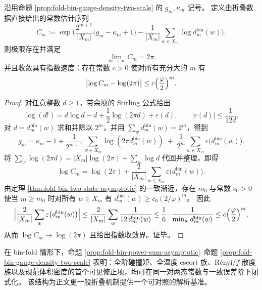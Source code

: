 \begin{corollary}\label{cor:fold-bin-recover-2pi}
沿用命题 \ref{prop:fold-bin-gauge-density-two-scale} 的 \(g_m,\kappa_m\) 记号。
定义由折叠数据直接给出的常数估计序列
\[
C_m
:=\exp\!\Biggl(
\frac{2^{m+1}}{|X_m|}\bigl(g_m-\kappa_m+1\bigr)
-\frac{1}{|X_m|}\sum_{w\in X_m}\log d^{\mathrm{bin}}_m(w)
\Biggr).
\]
则极限存在并满足
\[
\lim_{m\to\infty}C_m=2\pi.
\]
并且收敛具有指数速度：存在常数 \(c>0\) 使对所有充分大的 \(m\) 有
\[
\bigl|\log C_m-\log(2\pi)\bigr|\le c\Bigl(\frac{\varphi}{2}\Bigr)^m.
\]
\end{corollary}
\begin{proof}
对任意整数 \(d\ge 1\)，带余项的 Stirling 公式给出
\[
\log(d!)=d\log d-d+\frac12\log(2\pi d)+\varepsilon(d),
\qquad |\varepsilon(d)|\le \frac{1}{12d}.
\]
对 \(d=d^{\mathrm{bin}}_m(w)\) 求和并除以 \(2^m\)，并用 \(\sum_w d^{\mathrm{bin}}_m(w)=2^m\)，得到
\[
g_m
=\kappa_m-1+\frac{1}{2^{m+1}}\sum_{w\in X_m}\log(2\pi d^{\mathrm{bin}}_m(w))
\;+\;\frac{1}{2^m}\sum_{w\in X_m}\varepsilon\bigl(d^{\mathrm{bin}}_m(w)\bigr).
\]
将
\(
\sum_w \log(2\pi d)=|X_m|\log(2\pi)+\sum_w \log d
\)
代回并整理，即得
\[
\log C_m=\log(2\pi)+\frac{2}{|X_m|}\sum_{w\in X_m}\varepsilon\bigl(d^{\mathrm{bin}}_m(w)\bigr).
\]
由定理 \ref{thm:fold-bin-two-state-asymptotic} 的一致渐近，存在 \(m_0\) 与常数 \(c_0>0\) 使当 \(m\ge m_0\) 时对所有 \(w\in X_m\) 有
\(
d^{\mathrm{bin}}_m(w)\ge c_0(2/\varphi)^m
\)。
因此
\[
\Bigl|\frac{2}{|X_m|}\sum_{w}\varepsilon\bigl(d^{\mathrm{bin}}_m(w)\bigr)\Bigr|
\le \frac{2}{|X_m|}\sum_{w}\frac{1}{12\,d^{\mathrm{bin}}_m(w)}
\le \frac{1}{6}\cdot \frac{1}{\min_w d^{\mathrm{bin}}_m(w)}
\le c\Bigl(\frac{\varphi}{2}\Bigr)^m,
\]
从而 \(\log C_m\to\log(2\pi)\) 且给出指数收敛界。证毕。
\end{proof}





\begin{remark}[两态压缩作为解析基准解]\label{rem:fold-bin-solvable-model}
在 bin-fold 情形下，命题 \ref{prop:fold-bin-power-sum-asymptotic}--命题 \ref{prop:fold-bin-gauge-density-two-scale} 表明：全阶碰撞矩、全温度 escort 族、Rényi/\(f\)-散度族以及规范体积密度的首个可见修正项，均可在同一对两态常数与一致误差阶下闭式化。
该结构为正文更一般折叠机制提供一个可对照的解析基准。
\end{remark}


